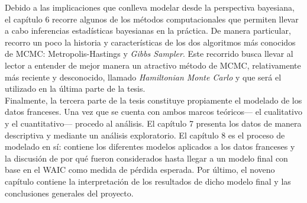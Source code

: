 Debido a las implicaciones que conlleva modelar desde la perspectiva bayesiana, el capítulo 6 recorre algunos de los métodos computacionales que permiten llevar a cabo inferencias estadísticas bayesianas en la práctica. De manera particular, recorro un poco la historia y características de los dos algoritmos más conocidos de MCMC: Metropolis-Hastings y \textit{Gibbs Sampler}. Este recorrido busca llevar al lector a entender de mejor manera un atractivo método de MCMC, relativamente más reciente y desconocido, llamado \textit{Hamiltonian Monte Carlo} y que será el utilizado en la última parte de la tesis.\\

Finalmente, la tercera parte de la tesis constituye propiamente el modelado de los datos franceses. Una vez que se cuenta con ambos marcos teóricos--- el cualitativo y el cuantitativo--- procedo al análisis. El capítulo 7 presenta los datos de manera descriptiva y mediante un análisis exploratorio. El capítulo 8 es el proceso de modelado en sí: contiene los diferentes modelos aplicados a los datos franceses y la discusión de por qué fueron considerados hasta llegar a un modelo final con base en el WAIC como medida de pérdida esperada. Por último, el noveno capítulo contiene la interpretación de los resultados de dicho modelo final y las conclusiones generales del proyecto. 
